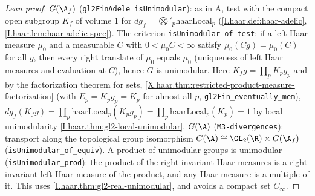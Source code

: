 \begin{proof}[Lean proof]
\emph{$G(\A_f)$} (\texttt{gl2FinAdele\_isUnimodular}): as in A, test with the compact open subgroup $K_f$ of volume $1$ for $dg_f=\bigotimes'_p\mathrm{haarLocal}_p$ (\cref{I.haar.def:haar-adelic}, \cref{I.haar.lem:haar-adelic-spec}). The criterion \texttt{isUnimodular\_of\_test}: if a left Haar measure $\mu_0$ and a measurable $C$ with $0<\mu_0C<\infty$ satisfy $\mu_0(Cg)=\mu_0(C)$ for all $g$, then every right translate of $\mu_0$ equals $\mu_0$ (uniqueness of left Haar measures and evaluation at $C$), hence $G$ is unimodular. Here $K_fg=\prod_pK_pg_p$ and by the factorization theorem for sets, \cref{X.haar.thm:restricted-product-measure-factorization} (with $E_p=K_pg_p=K_p$ for almost all $p$, \texttt{gl2Fin\_eventually\_mem}), $dg_f(K_fg)=\prod_p\mathrm{haarLocal}_p(K_pg_p)=\prod_p\mathrm{haarLocal}_p(K_p)=1$ by local unimodularity \cref{I.haar.thm:gl2-local-unimodular}. \emph{$G(\A)$} (\texttt{M3-divergences}): transport along the topological group isomorphism $G(\A)\cong\GL_2(\R)\times G(\A_f)$ (\texttt{isUnimodular\_of\_equiv}). A product of unimodular groups is unimodular (\texttt{isUnimodular\_prod}): the product of the right invariant Haar measures is a right invariant left Haar measure of the product, and any Haar measure is a multiple of it. This uses \cref{I.haar.thm:gl2-real-unimodular}, and avoids a compact set $C_\infty$.
\end{proof}

